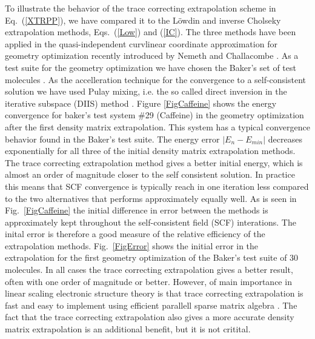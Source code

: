 \documentclass[twocolumn,showpacs,preprintnumbers,amsmath,amssymb]{revtex4}
\begin{document}
To illustrate the behavior of the trace correcting extrapolation scheme in Eq.\ (\ref{XTRPP}), 
we have compared it to the L\"{o}wdin and inverse Cholseky extrapolation methods, 
Eqs.\ (\ref{Low}) and (\ref{IC}).  The three methods have been applied
in the quasi-independent curvlinear coordinate approximation for geometry optimization 
recently introduced by Nemeth and Challacombe \cite{Nemeth04,Mondo_SCF}. As a test suite for the
geometry optimization we have chosen the Baker's set of test molecules \cite{Baker93,Nemeth04}.
As the accelleration technique for the convergence to a self-consistent 
solution we have used Pulay mixing, i.e. the so called direct inversion 
in the iterative subspace (DIIS) method \cite{Pulay80}.  Figure \ref{FigCaffeine} 
shows the energy convergence for baker's test system \#29 (Caffeine) in
the geometry optimization after the first density matrix extrapolation. This system
has a typical convergence behavior found in the Baker's test suite.
The energy error $|E_n-E_{min}|$ decreases exponentially for all three of the
initial density matrix extrapolation methods. 
The trace correcting extrapolation method gives a better initial energy, 
which is almost an order of magnitude closer to the self consistent
solution. In practice this means that SCF convergence is typically reach in one iteration
less compared to the two alternatives that performs approximately equally well. As is seen
in Fig.\ \ref{FigCaffeine} the initial difference in error between the methods is 
approximately kept throughout the self-consistent
field (SCF) interations. The inital error is therefore a good measure of the relative efficiency
of the extrapolation methods. Fig.\ \ref{FigError} shows the initial error in the
extrapolation for the first geometry optimization of the Baker's test suite of 30 molecules.
In all cases the trace correcting extrapolation gives a better result, often with one
order of magnitude or better. However, of
main importance in linear scaling electronic structure theory is that trace correcting
extrapolation is fast and easy to implement using efficient parallell sparse matrix 
algebra \cite{Mondo_SCF}. The fact that the trace correcting extrapolation
also gives a more accurate density matrix extrapolation is an additional benefit,
but it is not critital.
\end{document}
